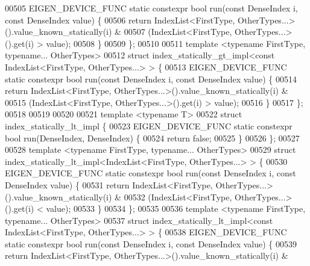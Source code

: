 \begin{DoxyCode}
00505   EIGEN\_DEVICE\_FUNC \textcolor{keyword}{static} constexpr \textcolor{keywordtype}{bool} run(\textcolor{keyword}{const} DenseIndex i, \textcolor{keyword}{const} DenseIndex value) \{
00506     \textcolor{keywordflow}{return} IndexList<FirstType, OtherTypes...>().value\_known\_statically(i) &
00507         (IndexList<FirstType, OtherTypes...>().\textcolor{keyword}{get}(i) > value);
00508   \}
00509 \};
00510 
00511 \textcolor{keyword}{template} <\textcolor{keyword}{typename} FirstType, \textcolor{keyword}{typename}... OtherTypes>
00512 \textcolor{keyword}{struct }index\_statically\_gt\_impl<const IndexList<FirstType, OtherTypes...> > \{
00513   EIGEN\_DEVICE\_FUNC \textcolor{keyword}{static} constexpr \textcolor{keywordtype}{bool} run(\textcolor{keyword}{const} DenseIndex i, \textcolor{keyword}{const} DenseIndex value) \{
00514     \textcolor{keywordflow}{return} IndexList<FirstType, OtherTypes...>().value\_known\_statically(i) &
00515         (IndexList<FirstType, OtherTypes...>().\textcolor{keyword}{get}(i) > value);
00516   \}
00517 \};
00518 
00519 
00520 
00521 \textcolor{keyword}{template} <\textcolor{keyword}{typename} T>
00522 \textcolor{keyword}{struct }index\_statically\_lt\_impl \{
00523   EIGEN\_DEVICE\_FUNC \textcolor{keyword}{static} constexpr \textcolor{keywordtype}{bool} run(DenseIndex, DenseIndex) \{
00524     \textcolor{keywordflow}{return} \textcolor{keyword}{false};
00525   \}
00526 \};
00527 
00528 \textcolor{keyword}{template} <\textcolor{keyword}{typename} FirstType, \textcolor{keyword}{typename}... OtherTypes>
00529 \textcolor{keyword}{struct }index\_statically\_lt\_impl<IndexList<FirstType, OtherTypes...> > \{
00530   EIGEN\_DEVICE\_FUNC \textcolor{keyword}{static} constexpr \textcolor{keywordtype}{bool} run(\textcolor{keyword}{const} DenseIndex i, \textcolor{keyword}{const} DenseIndex value) \{
00531     \textcolor{keywordflow}{return} IndexList<FirstType, OtherTypes...>().value\_known\_statically(i) &
00532         (IndexList<FirstType, OtherTypes...>().\textcolor{keyword}{get}(i) < value);
00533   \}
00534 \};
00535 
00536 \textcolor{keyword}{template} <\textcolor{keyword}{typename} FirstType, \textcolor{keyword}{typename}... OtherTypes>
00537 \textcolor{keyword}{struct }index\_statically\_lt\_impl<const IndexList<FirstType, OtherTypes...> > \{
00538   EIGEN\_DEVICE\_FUNC \textcolor{keyword}{static} constexpr \textcolor{keywordtype}{bool} run(\textcolor{keyword}{const} DenseIndex i, \textcolor{keyword}{const} DenseIndex value) \{
00539     \textcolor{keywordflow}{return} IndexList<FirstType, OtherTypes...>().value\_known\_statically(i) &

\end{DoxyCode}
